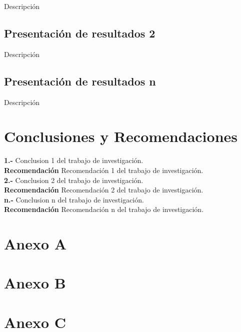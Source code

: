 \documentclass[oneside,11pt]{Latex/Classes/PhDthesisPSnPDF}
\begin{document}
Descripción\\

\section{Presentación de resultados 2}

Descripción\\

\section{Presentación de resultados n}

Descripción\\

\chapter{Conclusiones y Recomendaciones}

\textbf{1.-} Conclusion 1 del trabajo de investigación.\\

\textbf{Recomendación} Recomendación 1 del trabajo de investigación.\\

\textbf{2.-} Conclusion 2 del trabajo de investigación.\\

\textbf{Recomendación} Recomendación 2 del trabajo de investigación.\\

\textbf{n.-} Conclusion n del trabajo de investigación.\\

\textbf{Recomendación} Recomendación n del trabajo de investigación.\\

\appendix
\renewcommand{\thechapter}{\Alph{chapter}}

\chapter{Anexo A}

\chapter{Anexo B}

\chapter{Anexo C}

\renewcommand{\bibname}{Lista de Referencias}
 
 

\end{document}
